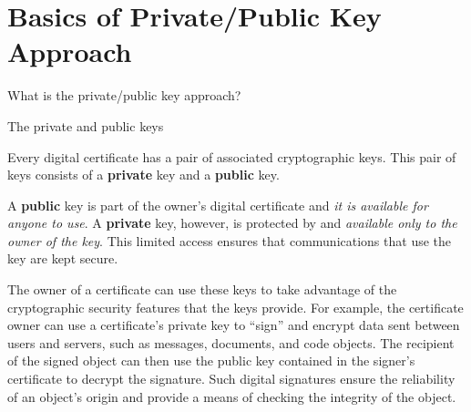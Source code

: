 \section{Basics of Private/Public Key Approach}
\begin{frame}[t,fragile]{What is the private/public key approach?}
  \begin{block}{The \alert{private} and \alert{public} keys}
    {\footnotesize
Every digital certificate has a pair of associated cryptographic
keys. This pair of keys consists of a \textbf{private} key and a \textbf{public} key. 

\vspace{0.25cm}
A \textbf{public} key is part of the owner's digital certificate and \emph{it is available for anyone to use}. A \textbf{private} key, however, is protected by and \emph{available only to the owner of the key}. This limited access ensures that communications that use the key are kept secure.

\vspace{0.25cm}
The owner of a certificate can use these keys to take advantage of the
cryptographic security features that the keys provide. For example,
the certificate owner can use a certificate's private key to ``sign''
and encrypt data sent between users and servers, such as messages,
documents, and code objects. The recipient of the signed object can
then use the public key contained in the signer's certificate to
decrypt the signature. Such digital signatures ensure the reliability
of an object's origin and provide a means of checking the integrity of
the object.
}
  \end{block}
  
\end{frame}
